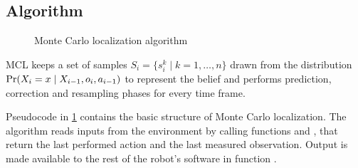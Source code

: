\subsection{Algorithm}

\begin{figure}[p]
\begin{algorithm}[H]

	\samples \assign \initialize{}\;
	\Forever{}{
		\samples \assign \predict{\samples, \getAction{}}\;
		\weights \assign \correct{\samples, \getObservation{}}\;
		\samples \assign \resample{\samples, \weights}\;
		\BlankLine
		\outputPosition{\samples}
	}

	\BlankLine
	\BlankLine
	\BlankLine

	\BlankLine
	\BlankLine
	\BlankLine

	\BlankLine
	\BlankLine
	\BlankLine
\end{algorithm}
\caption{Monte Carlo localization algorithm}
\label{algo:mcl}
\end{figure}

MCL keeps a set of samples \(S_i = \{s^k_{i} \mid k = 1,\dotsc,n\} \) drawn from the distribution
\(\operatorname{\mathrm{Pr}}(X_i = x \mid X_{i-1}, o_i, a_{i - 1})\) to represent the belief and performs
prediction, correction and resampling phases for every time frame.

Pseudocode in \cref{algo:mcl} contains the basic structure of Monte Carlo localization.
The algorithm reads inputs from the environment by calling functions
\getAction{} and \getObservation{}, that return the last performed action and the
last measured observation.
Output is made available to the rest of the robot's software in function \outputPosition{}.

